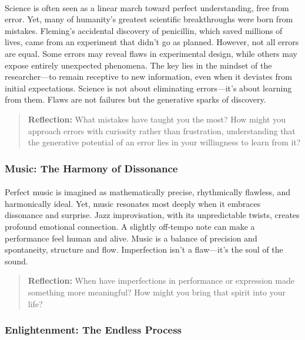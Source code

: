 \documentclass[12pt]{article}
\begin{document}
\paragraph{}
Science is often seen as a linear march toward perfect understanding, free from error. Yet, many of humanity’s greatest scientific breakthroughs were born from mistakes. Fleming’s accidental discovery of penicillin, which saved millions of lives, came from an experiment that didn’t go as planned. However, not all errors are equal. Some errors may reveal flaws in experimental design, while others may expose entirely unexpected phenomena. The key lies in the mindset of the researcher—to remain receptive to new information, even when it deviates from initial expectations. Science is not about eliminating errors—it’s about learning from them. Flaws are not failures but the generative sparks of discovery.

\begin{quote}
\textbf{Reflection:}
What mistakes have taught you the most? How might you approach errors with curiosity rather than frustration, understanding that the generative potential of an error lies in your willingness to learn from it?
\end{quote}

\subsubsection{Music: The Harmony of Dissonance}
\paragraph{}
Perfect music is imagined as mathematically precise, rhythmically flawless, and harmonically ideal. Yet, music resonates most deeply when it embraces dissonance and surprise. Jazz improvisation, with its unpredictable twists, creates profound emotional connection. A slightly off-tempo note can make a performance feel human and alive. Music is a balance of precision and spontaneity, structure and flow. Imperfection isn’t a flaw—it’s the soul of the sound.

\begin{quote}
\textbf{Reflection:}  
When have imperfections in performance or expression made something more meaningful? How might you bring that spirit into your life?
\end{quote}

\subsubsection{Enlightenment: The Endless Process}
\end{document}
